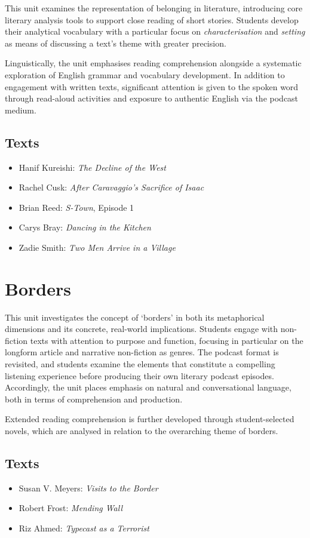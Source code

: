 \documentclass[10pt,a4paper]{article}
\begin{document}
This unit examines the representation of belonging in literature, introducing core literary analysis tools to support close reading of short stories. Students develop their analytical vocabulary with a particular focus on \textit{characterisation} and \textit{setting} as means of discussing a text's theme with greater precision.

Linguistically, the unit emphasises reading comprehension alongside a systematic exploration of English grammar and vocabulary development. In addition to engagement with written texts, significant attention is given to the spoken word through read-aloud activities and exposure to authentic English via the podcast medium.

\subsection*{Texts}

\begin{itemize}
	\item Hanif Kureishi: \textit{The Decline of the West}
	\item Rachel Cusk: \textit{After Caravaggio's Sacrifice of Isaac}
	\item Brian Reed: \textit{S-Town}, Episode 1
	\item Carys Bray: \textit{Dancing in the Kitchen}
	\item Zadie Smith: \textit{Two Men Arrive in a Village}
\end{itemize}

\section{Borders}

This unit investigates the concept of `borders' in both its metaphorical dimensions and its concrete, real-world implications. Students engage with non-fiction texts with attention to purpose and function, focusing in particular on the longform article and narrative non-fiction as genres. The podcast format is revisited, and students examine the elements that constitute a compelling listening experience before producing their own literary podcast episodes. Accordingly, the unit places emphasis on natural and conversational language, both in terms of comprehension and production.

Extended reading comprehension is further developed through student-selected novels, which are analysed in relation to the overarching theme of borders.

\subsection*{Texts}

\begin{itemize}
	\item Susan V. Meyers: \textit{Visits to the Border}
	\item Robert Frost: \textit{Mending Wall}
	\item Riz Ahmed: \textit{Typecast as a Terrorist}
\end{itemize}
\end{document}
